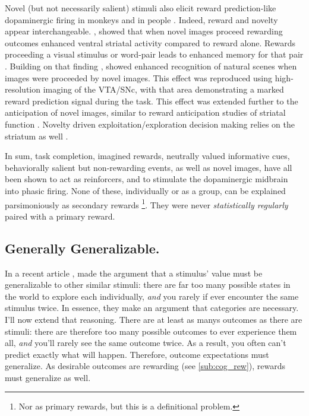 \documentclass[doc,12pt]{apa}        %
\begin{document}
Novel (but not necessarily salient) stimuli also elicit reward prediction-like dopaminergic firing in monkeys \cite{Blatter:2006p6372} and in people \cite{Bunzeck:2006p5319}. Indeed, reward and novelty appear interchangeable.  , showed that when novel images proceed rewarding outcomes enhanced ventral striatal activity compared to reward alone.  Rewards proceeding a visual stimulus or word-pair leads to enhanced memory for that pair \cite{Lisman:2005p5455}.  Building on that finding , showed enhanced recognition of natural scenes when images were proceeded by novel images.  This effect was reproduced using high-resolution imaging of the VTA/SNc, with that area demonstrating a marked reward prediction signal during the task.  This effect was extended further to the anticipation of novel images, similar to reward anticipation studies of striatal function \cite{Knutson:2001p5234}.  Novelty driven exploitation/exploration decision making relies on the striatum as well \cite{Wittmann:2008p541}.

In sum, task completion, imagined rewards, neutrally valued informative cues, behaviorally salient but non-rewarding events, as well as novel images, have all been shown to act as reinforcers, and to stimulate the dopaminergic midbrain into phasic firing.  None of these, individually or as a group, can be explained parsimoniously as secondary rewards
\footnote{
    Nor as primary rewards, but this is a definitional problem.
}.  They were never \emph{statistically regularly} paired with a primary reward.


\subsection{Generally Generalizable.}
\label{sub:gen}
In a recent article , made the argument that a stimulus' value must be generalizable to other similar stimuli: there are far too many possible states in the world to explore each individually, \emph{and} you rarely if ever encounter the same stimulus twice.  In essence, they make an argument that categories are necessary.  I'll now extend that reasoning.  There are at least as manys outcomes as there are stimuli: there are therefore too many possible outcomes to ever experience them all, \emph{and} you'll rarely see the same outcome twice.  As a result, you often can't predict exactly what will happen. Therefore, outcome expectations must generalize.  As desirable outcomes are rewarding (see \ref{sub:cog_rew}), rewards must generalize as well.
\end{document}

